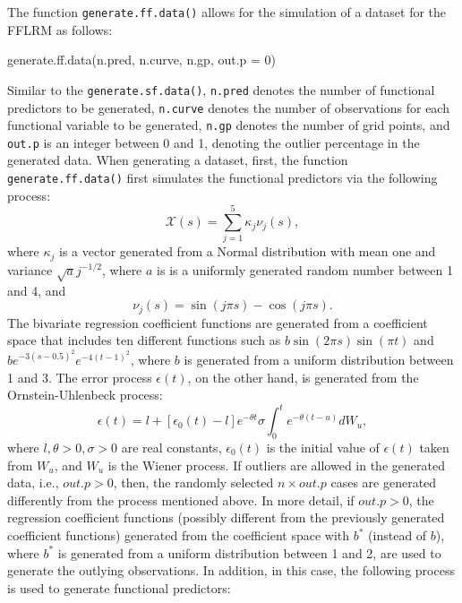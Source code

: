 The function \texttt{generate.ff.data()} allows for the simulation of a dataset for the FFLRM as follows:
\begin{smallexample}
\begin{smallverbatim}
generate.ff.data(n.pred, n.curve, n.gp, out.p = 0)
\end{smallverbatim}
\end{smallexample}
Similar to the \texttt{generate.sf.data()}, \texttt{n.pred} denotes the number of functional predictors to be generated, \texttt{n.curve} denotes the number of observations for each functional variable to be generated, \texttt{n.gp} denotes the number of grid points, and \texttt{out.p} is an integer between 0 and 1, denoting the outlier percentage in the generated data. When generating a dataset, first, the function \texttt{generate.ff.data()} first simulates the functional predictors via the following process:
\begin{equation*}
\mathcal{X}(s) = \sum_{j=1}^5 \kappa_j \nu_j(s),
\end{equation*}
where $\kappa_j$ is a vector generated from a Normal distribution with mean one and variance $\sqrt{a}j^{-1/2}$, where $a$ is is a uniformly generated random number between 1 and 4, and
\begin{equation*}
\nu_j(s) = \sin (j \pi s) - \cos (j \pi s).
\end{equation*}
The bivariate regression coefficient functions are generated from a coefficient space that includes ten different functions such as $b \sin(2 \pi s) \sin(\pi t)$ and $b e^{-3(s-0.5)^2} e^{-4(t-1)^2}$, where $b$ is generated from a uniform distribution between 1 and 3. The error process $\epsilon(t)$, on the other hand, is generated from the Ornstein-Uhlenbeck process:
\begin{equation*}
\epsilon(t) = l + [\epsilon_0(t) - l] e^{-\theta t} \sigma \int_0^t e^{-\theta (t-u)} d W_u,
\end{equation*}
where $l, \theta > 0, \sigma > 0$ are real constants, $\epsilon_0(t)$ is the initial value of $\epsilon(t)$ taken from $W_u$, and $W_u$ is the Wiener process. If outliers are allowed in the generated data, i.e., $out.p > 0$, then, the randomly selected $ n \times out.p$ cases are generated differently from the process mentioned above. In more detail, if $out.p > 0$, the regression coefficient functions (possibly different from the previously generated coefficient functions) generated from the coefficient space with $b^*$ (instead of $b$), where $b^*$ is generated from a uniform distribution between 1 and 2, are used to generate the outlying observations. In addition, in this case, the following process is used to generate functional predictors:
